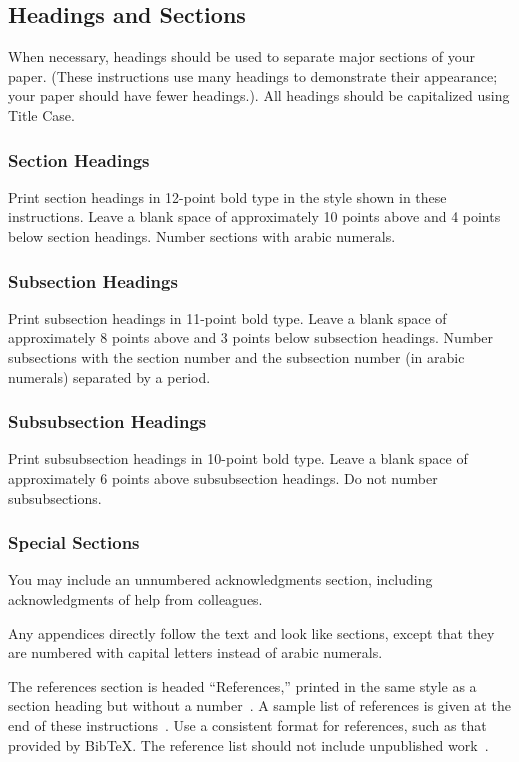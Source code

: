 \documentclass{article}
\begin{document}
\subsection{Headings and Sections}

When necessary, headings should be used to separate major sections of
your paper. (These instructions use many headings to demonstrate their
appearance; your paper should have fewer headings.). All headings should be capitalized using Title Case.

\subsubsection{Section Headings}

Print section headings in 12-point bold type in the style shown in
these instructions. Leave a blank space of approximately 10 points
above and 4 points below section headings.  Number sections with
arabic numerals.

\subsubsection{Subsection Headings}

Print subsection headings in 11-point bold type. Leave a blank space
of approximately 8 points above and 3 points below subsection
headings. Number subsections with the section number and the
subsection number (in arabic numerals) separated by a
period.

\subsubsection{Subsubsection Headings}

Print subsubsection headings in 10-point bold type. Leave a blank
space of approximately 6 points above subsubsection headings. Do not
number subsubsections.

\subsubsection{Special Sections}

You may include an unnumbered acknowledgments section, including
acknowledgments of help from colleagues.

Any appendices directly follow the text and look like sections, except
that they are numbered with capital letters instead of arabic
numerals.

The references section is headed ``References,'' printed in the same
style as a section heading but without a number~\cite{russell-norvig:Modern}. A sample list of
references is given at the end of these instructions~\cite{rupeneite:Reinforcement}. Use a consistent
format for references, such as that provided by Bib\TeX{}. The reference
list should not include unpublished work~\cite{trc:hs}.
\end{document}
